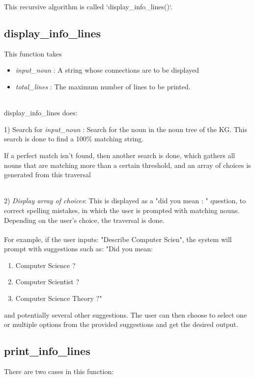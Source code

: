 \documentclass[conference]{IEEEtran}
\begin{document}
This recursive algorithm is called `display\_info\_lines()`.



\subsection{\textbf{display\_info\_lines}}

This function takes
\begin{itemize}
\item \textit{input\_noun} : A string whose connections are to be displayed
\item \textit{total\_lines} : The maximum number of lines to be printed. 
\end{itemize}

\\

display\_info\_lines does:

1) Search for \textit{input\_noun} : Search for the noun in the noun tree of the KG. This search is done to find a 100\% matching string.

If a perfect match isn't found, then another search is done, which gathers all nouns that are matching more than a certain threshold, and an array of choices is generated from this traversal

\\
2) \textit{Display array of choices}: This is displayed as a "did you mean : " question, to correct spelling mistakes, in which the user is prompted with matching nouns. Depending on the user’s choice, the traversal is done.\\

\\
For example, if the user inputs: "Describe Computer Scien", the system will prompt with suggestions such as:
"Did you mean:

\begin{enumerate}
    \item Computer Science ?
    \item Computer Scientist ?
    \item Computer Science Theory ?"
\end{enumerate}

and potentially several other suggestions.
The user can then choose to select one or multiple options from the provided suggestions and get the desired output.


\subsection{\textbf{print\_info\_lines}}
There are two cases in this function:
\end{document}

